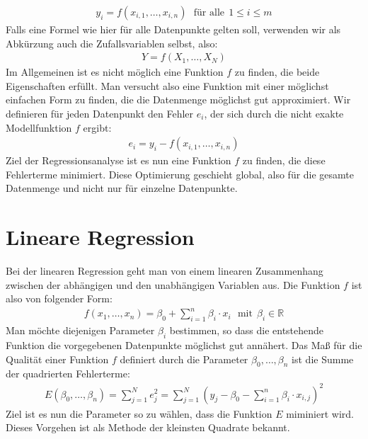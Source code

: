 \begin{align*}
    y_i = f(x_{i, 1}, \dots, x_{i, n}) ~~~\text{für alle}~~ 1 \leq i \leq m
\end{align*}
Falls eine Formel wie hier für alle Datenpunkte gelten soll, verwenden wir als Abkürzung auch die Zufallsvariablen selbst, also:
\begin{align*}
    Y = f(X_1, \dots, X_N)
\end{align*}
Im Allgemeinen ist es nicht möglich eine Funktion $f$ zu finden, die beide Eigenschaften erfüllt. Man versucht also eine Funktion mit einer möglichst einfachen Form zu finden, die die Datenmenge möglichst gut approximiert. Wir definieren für jeden Datenpunkt den Fehler $e_i$, der sich durch die nicht exakte Modellfunktion $f$ ergibt:
\begin{align*}
    e_i = y_i - f(x_{i, 1}, \dots, x_{i, n})
\end{align*}
Ziel der Regressionsanalyse ist es nun eine Funktion $f$ zu finden, die diese Fehlerterme minimiert. Diese Optimierung geschieht global, also für die gesamte Datenmenge und nicht nur für einzelne Datenpunkte.

\section{Lineare Regression}

Bei der linearen Regression geht man von einem linearen Zusammenhang zwischen der abhängigen und den unabhängigen Variablen aus. Die Funktion $f$ ist also von folgender Form:
\begin{align*}
    f(x_1, \dots, x_n) = \beta_0 + \sum_{i=1}^n \beta_i \cdot x_i ~~~ \text{mit} ~~ \beta_i \in \mathbb{R}
\end{align*}
Man möchte diejenigen Parameter $\beta_i$ bestimmen, so dass die entstehende Funktion die vorgegebenen Datenpunkte möglichst gut annähert. Das Maß für die Qualität einer Funktion $f$ definiert durch die Parameter $\beta_0, \dots, \beta_n$ ist die Summe der quadrierten Fehlerterme:
\begin{align*}
    E(\beta_0, \dots, \beta_n) = \sum_{j=1}^N e_j^2 = \sum_{j=1}^N \left( y_j - \beta_0 - \sum_{i=1}^n \beta_i \cdot x_{i, j} \right)^2
\end{align*}
Ziel ist es nun die Parameter so zu wählen, dass die Funktion $E$ miminiert wird. Dieses Vorgehen ist als Methode der kleinsten Quadrate bekannt.
